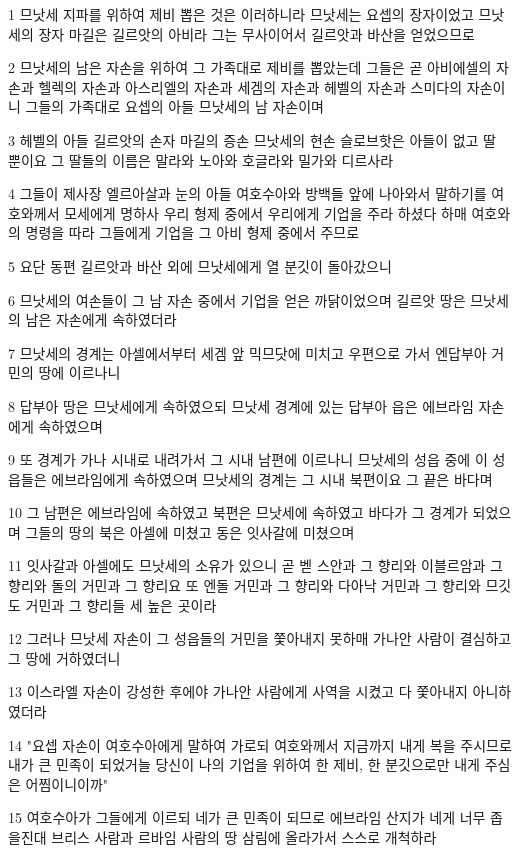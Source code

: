 \par 1 므낫세 지파를 위하여 제비 뽑은 것은 이러하니라 므낫세는 요셉의 장자이었고 므낫세의 장자 마길은 길르앗의 아비라 그는 무사이어서 길르앗과 바산을 얻었으므로
\par 2 므낫세의 남은 자손을 위하여 그 가족대로 제비를 뽑았는데 그들은 곧 아비에셀의 자손과 헬렉의 자손과 아스리엘의 자손과 세겜의 자손과 헤벨의 자손과 스미다의 자손이니 그들의 가족대로 요셉의 아들 므낫세의 남 자손이며
\par 3 헤벨의 아들 길르앗의 손자 마길의 증손 므낫세의 현손 슬로브핫은 아들이 없고 딸 뿐이요 그 딸들의 이름은 말라와 노아와 호글라와 밀가와 디르사라
\par 4 그들이 제사장 엘르아살과 눈의 아들 여호수아와 방백들 앞에 나아와서 말하기를 여호와께서 모세에게 명하사 우리 형제 중에서 우리에게 기업을 주라 하셨다 하매 여호와의 명령을 따라 그들에게 기업을 그 아비 형제 중에서 주므로
\par 5 요단 동편 길르앗과 바산 외에 므낫세에게 열 분깃이 돌아갔으니
\par 6 므낫세의 여손들이 그 남 자손 중에서 기업을 얻은 까닭이었으며 길르앗 땅은 므낫세의 남은 자손에게 속하였더라
\par 7 므낫세의 경계는 아셀에서부터 세겜 앞 믹므닷에 미치고 우편으로 가서 엔답부아 거민의 땅에 이르나니
\par 8 답부아 땅은 므낫세에게 속하였으되 므낫세 경계에 있는 답부아 읍은 에브라임 자손에게 속하였으며
\par 9 또 경계가 가나 시내로 내려가서 그 시내 남편에 이르나니 므낫세의 성읍 중에 이 성읍들은 에브라임에게 속하였으며 므낫세의 경계는 그 시내 북편이요 그 끝은 바다며
\par 10 그 남편은 에브라임에 속하였고 북편은 므낫세에 속하였고 바다가 그 경계가 되었으며 그들의 땅의 북은 아셀에 미쳤고 동은 잇사갈에 미쳤으며
\par 11 잇사갈과 아셀에도 므낫세의 소유가 있으니 곧 벧 스안과 그 향리와 이블르암과 그 향리와 돌의 거민과 그 향리요 또 엔돌 거민과 그 향리와 다아낙 거민과 그 향리와 므깃도 거민과 그 향리들 세 높은 곳이라
\par 12 그러나 므낫세 자손이 그 성읍들의 거민을 쫓아내지 못하매 가나안 사람이 결심하고 그 땅에 거하였더니
\par 13 이스라엘 자손이 강성한 후에야 가나안 사람에게 사역을 시켰고 다 쫓아내지 아니하였더라
\par 14 "요셉 자손이 여호수아에게 말하여 가로되 여호와께서 지금까지 내게 복을 주시므로 내가 큰 민족이 되었거늘 당신이 나의 기업을 위하여 한 제비, 한 분깃으로만 내게 주심은 어찜이니이까"
\par 15 여호수아가 그들에게 이르되 네가 큰 민족이 되므로 에브라임 산지가 네게 너무 좁을진대 브리스 사람과 르바임 사람의 땅 삼림에 올라가서 스스로 개척하라
